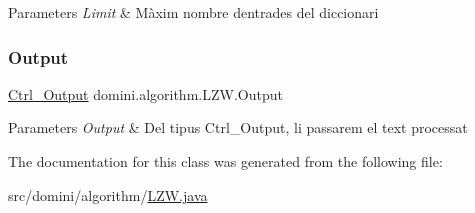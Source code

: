 \begin{DoxyParams}{Parameters}
{\em Limit} & Màxim nombre d\textquotesingle{}entrades del diccionari \\
\hline
\end{DoxyParams}
\mbox{\label{classdomini_1_1algorithm_1_1LZW_a22cd522a89b5226a3fb3424ffe122f72}} 
\subsubsection{\texorpdfstring{Output}{Output}}
{\footnotesize\ttfamily \hyperlink{classpersistencia_1_1output_1_1Ctrl__Output}{Ctrl\+\_\+\+Output} domini.\+algorithm.\+L\+Z\+W.\+Output\hspace{0.3cm}{\ttfamily [package]}}


\begin{DoxyParams}{Parameters}
{\em Output} & Del tipus Ctrl\+\_\+\+Output, li passarem el text processat \\
\hline
\end{DoxyParams}


The documentation for this class was generated from the following file\+:\begin{DoxyCompactItemize}
\item 
src/domini/algorithm/\hyperlink{LZW_8java}{L\+Z\+W.\+java}\end{DoxyCompactItemize}
